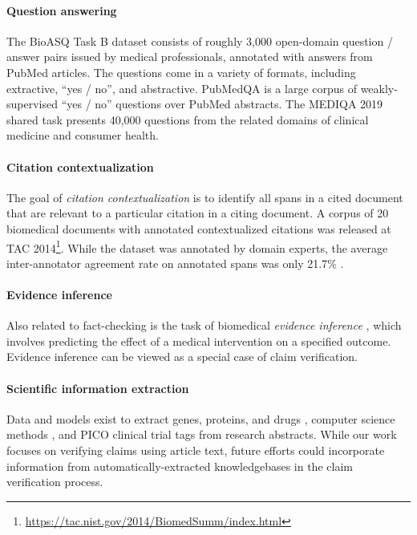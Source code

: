 \paragraph{Question answering}  The BioASQ Task B \cite{Tsatsaronis2015AnOO} dataset consists of roughly 3,000 open-domain question / answer pairs issued by medical professionals, annotated with answers from PubMed articles. The questions come in a variety of formats, including extractive, ``yes / no'', and abstractive. PubMedQA \cite{Jin2019PubMedQAAD} is a large corpus of weakly-supervised ``yes / no'' questions over PubMed abstracts. The MEDIQA 2019 shared task \cite{Abacha2019OverviewOT} presents 40,000 questions from the related domains of clinical medicine and consumer health.

\paragraph{Citation contextualization}  The goal of \emph{citation contextualization} is to identify all spans in a cited document that are relevant to a particular citation in a citing document. A corpus of 20 biomedical documents with annotated contextualized citations was released at TAC 2014\footnote{\url{https://tac.nist.gov/2014/BiomedSumm/index.html}}. While the dataset was annotated by domain experts, the average inter-annotator agreement rate on annotated spans was only 21.7\% \cite{Cohan2015MatchingCT}.

\paragraph{Evidence inference}  Also related to fact-checking is the task of biomedical \emph{evidence inference} \cite{Lehman2019InferringWM}, which involves predicting the effect of a medical intervention on a specified outcome. Evidence inference can be viewed as a special case of claim verification.

\paragraph{Scientific information extraction}  Data and models exist to extract genes, proteins, and drugs \cite{Kim2003GENIAC, Krallinger2017OverviewOT}, computer science methods \cite{Luan2018MultiTaskIO}, and PICO clinical trial tags \cite{Nye2018ACW} from research abstracts. While our work focuses on verifying claims using article text, future efforts could incorporate information from automatically-extracted knowledgebases in the claim verification process.
